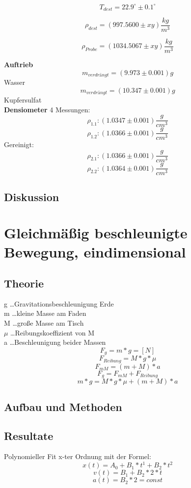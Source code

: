 \documentclass[12pt,a4paper]{article}
\begin{document}
\begin{multicols}{2}
$$T_{dest} = 22.9^\circ \pm 0.1^\circ$$

$$\rho_{dest} = (997.5600 \pm xy) \frac{kg}{m^3}$$

$$\rho_{Probe} = (1034.5067 \pm xy) \frac{kg}{m^3}$$

\textbf{Auftrieb}
$$m_{verdrängt} = (9.973 \pm 0.001)g$$ Wasser\\
$$m_{verdrängt} = (10.347 \pm 0.001)g$$ Kupfersulfat\\

\textbf{Densiometer}
4 Messungen:
$$\rho_{1.1}:   (1.0347 \pm 0.001) \frac{g}{cm^3}$$
$$\rho_{1.2}:   (1.0366 \pm 0.001) \frac{g}{cm^3}$$
Gereinigt:
$$\rho_{2.1}:   (1.0366 \pm 0.001) \frac{g}{cm^3}$$
$$\rho_{2.2}:   (1.0364 \pm 0.001) \frac{g}{cm^3}$$
\subsection{Diskussion}



\section{Gleichmäßig beschleunigte Bewegung, eindimensional}

\subsection{Theorie}

g \ldots Gravitationsbeschleunigung Erde\\
m \ldots kleine Masse am Faden\\
M \ldots große Masse am Tisch\\
$\mu$ \ldots Reibungskoeffizient von M\\
a \ldots Beschleunigung beider Massen\\

$$F_g = m * g = [N]$$
$$F_{Reibung} = M*g*\mu$$
$$F_{mM} = (m+M)*a$$
$$F_{g} = F_{mM} + F_{Reibung}$$
$$m * g = M*g*\mu + (m+M)*a$$

\subsection{Aufbau und Methoden}

\subsection{Resultate}
Polynomieller Fit x-ter Ordnung mit der Formel:
$$x(t) = A_0 + B_1*t^1 + B_2 * t^2$$
$$v(t) = B_1 + B_2 * 2 * t$$
$$a(t) = B_2 * 2 = const$$
\end{multicols}
\end{document}

